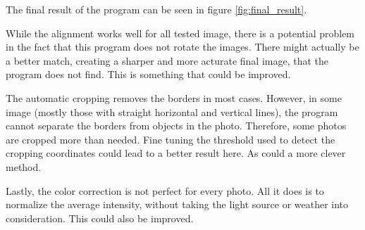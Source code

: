 \documentclass[12pt,a4paper]{article}
\begin{document}
  The final result of the program can be seen in figure \ref{fig:final_result}.

  While the alignment works well for all tested image, there is a potential problem in the fact that this program does not rotate the images. There might actually be a better match, creating a sharper and more acturate final image, that the program does not find. This is something that could be improved.

  The automatic cropping removes the borders in most cases. However, in some image (mostly those with straight horizontal and vertical lines), the program cannot separate the borders from objects in the photo. Therefore, some photos are cropped more than needed. Fine tuning the threshold used to detect the cropping coordinates could lead to a better result here. As could a more clever method.

  Lastly, the color correction is not perfect for every photo. All it does is to normalize the average intensity, without taking the light source or weather into consideration. This could also be improved.
\end{document}
